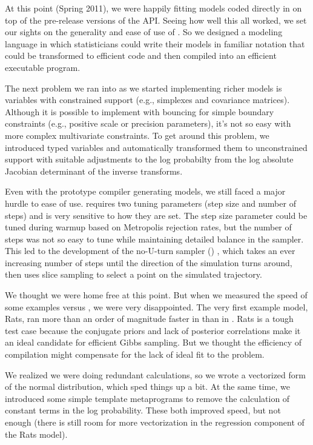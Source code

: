 At this point (Spring 2011), we were happily fitting models coded 
directly in \Cpp on top of the pre-release versions of the \Stan API. 
Seeing how well this all worked, we set our sights on the generality 
and ease of use of \BUGS.  So we designed a modeling language in which 
statisticians could write their models in familiar notation that could 
be transformed to efficient \Cpp code and then compiled into an 
efficient executable program.
 
The next problem we ran into as we started implementing richer models
is variables with constrained support (e.g., simplexes and covariance
matrices).  Although it is possible to implement \HMC with bouncing
for simple boundary constraints (e.g., positive scale or precision
parameters), it's not so easy with more complex multivariate
constraints.  To get around this problem, we introduced typed
variables and automatically transformed them to unconstrained support
with suitable adjustments to the log probabilty from the log absolute
Jacobian determinant of the inverse transforms.

Even with the prototype compiler generating models, we still faced a
major hurdle to ease of use.  \HMC requires two tuning parameters
(step size and number of steps) and is very sensitive to how they are
set.  The step size parameter could be tuned during warmup based on
Metropolis rejection rates, but the number of steps was not so easy to
tune while maintaining detailed balance in the sampler.  This led to
the development of the no-U-turn sampler (\NUTS)
\citep{Hoffman-Gelman:2012}, which takes an ever increasing number of
steps until the direction of the simulation turns around, then uses
slice sampling to select a point on the simulated trajectory.

We thought we were home free at this point.  But when we measured the
speed of some \BUGS examples versus \Stan, we were very disappointed.
The very first example model, Rats, ran more than an order of
magnitude faster in \JAGS than in \Stan.  Rats is a tough test case
because the conjugate priors and lack of posterior correlations make
it an ideal candidate for efficient Gibbs sampling.  But we thought
the efficiency of compilation might compensate for the lack of ideal
fit to the problem.  

We realized we were doing redundant calculations, so we wrote a
vectorized form of the normal distribution, which sped things up a
bit.  At the same time, we introduced some simple template
metaprograms to remove the calculation of constant terms in the log
probability.  These both improved speed, but not enough (there is
still room for more vectorization in the regression component of the
Rats model).

